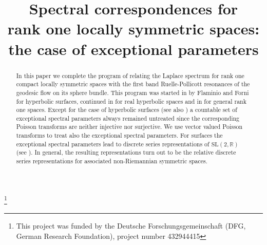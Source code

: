\documentclass[JEP,XML,SOM,NoFloatCountersInSection,Unicode,published]{cedram}
\theoremstyle{definition}
\begin{document}
\frontmatter

\title[Spectral correspondences for rank one locally symmetric spaces]{Spectral correspondences for\\ rank one locally symmetric spaces:\\ the case of exceptional parameters}

\author[\initial{C.} \lastname{Arends}]{ }
\address{Institut für Mathematik, Universität Paderborn\\
Warburger Str. 100,
33098 Paderborn, Germany}
\urladdr{}

\author[\initial{J.} \lastname{Hilgert}]{ }
\address{Institut für Mathematik, Universität Paderborn\\
Warburger Str. 100,
33098 Paderborn, Germany}
\urladdr{}

\thanks{This project was funded by the Deutsche Forschungsgemeinschaft (DFG, German Research Foundation), project number 432944415}

\begin{abstract}
In this paper we complete the program of relating the Laplace spectrum for rank one compact locally symmetric spaces with the first band Ruelle-Pollicott resonances of the geodesic flow on its sphere bundle. This program was started in \cite{FF03} by Flaminio and Forni for hyperbolic surfaces, continued in \cite{DFG} for real hyperbolic spaces and in \cite{GHWb} for general rank one spaces. Except for the case of hyperbolic surfaces (see also \cite{GHWa}) a countable set of exceptional spectral parameters always remained untreated since the corresponding Poisson transforms are neither injective nor surjective. We use vector valued Poisson transforms to treat also the exceptional spectral parameters. For surfaces the exceptional spectral parameters lead to discrete series representations of $\mathrm{SL}(2,\mathbb R)$ (see \cite{FF03, GHWa}). In general, the resulting representations turn out to be the relative discrete series representations for associated non-Riemannian symmetric spaces.
\end{abstract}



\end{document}
